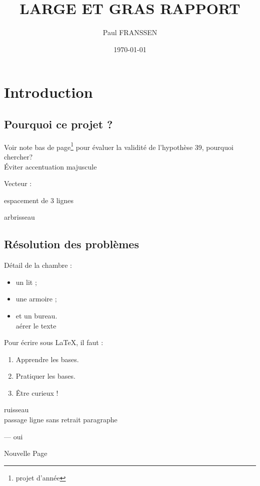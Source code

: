 \documentclass[a4paper, 12pt]{article}
\title{\Large \textbf{LARGE ET GRAS RAPPORT}}
\author{Paul FRANSSEN}
\date{\today}
\begin{document}
    \begin{titlepage}
        \maketitle
    \end{titlepage}
    
    \setcounter{page}{2}

    \tableofcontents

    \newpage

    \section{Introduction}
    \subsection{Pourquoi ce projet ?}

    Voir note bas de page\footnote{projet d'année} pour évaluer la validité de l'hypothèse 39, pourquoi chercher?
\\ %
    \'Eviter accentuation majuscule %

    Vecteur :  

    \vspace{3\baselineskip} 
    espacement de 3 lignes

    arbrisseau

    \subsection{Résolution des problèmes}
    Détail de la chambre :
    \begin{itemize}
        \item un lit ;
        \item une armoire ; 
        \item et un bureau. \\
        aérer le texte
        \end{itemize}

        \vspace{2\baselineskip} 
        Pour écrire sous \LaTeX{}, il
        faut :
        \begin{enumerate}
        \item Apprendre les bases.
        \item Pratiquer les bases.
        \item \^Etre curieux !
        \end{enumerate}

    ruisseau
    \\passage ligne sans retrait paragraphe
    
    \og --- oui \fg{}

    \newpage
    Nouvelle Page
    
\end{document}
